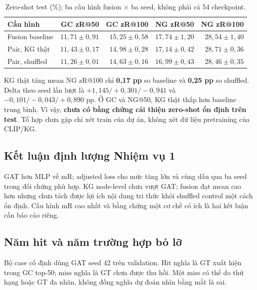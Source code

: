 \begin{table}[!t]\centering\small
\caption{Zero-shot test (\%); ba cấu hình fusion $\times$ ba seed, không phải cả 54 checkpoint.}\label{tab:zero}
\begin{tabular}{@{}lrrrr@{}}\toprule
Cấu hình & GC zR@50 & GC zR@100 & NG zR@50 & NG zR@100\\\midrule
Fusion baseline & $11,71\pm0,91$ & $15,25\pm0,58$ & $17,74\pm1,20$ & $28,54\pm1,40$\\
Pair, KG thật & $11,43\pm0,17$ & $14,98\pm0,28$ & $17,14\pm0,42$ & $28,71\pm0,36$\\
Pair, shuffled & $11,26\pm0,01$ & $14,63\pm0,16$ & $16,99\pm0,43$ & $28,46\pm0,35$\\
\bottomrule\end{tabular}\end{table}

KG thật tăng mean NG zR@100 chỉ \textbf{0,17 pp} so baseline và
\textbf{0,25 pp} so shuffled. Delta theo seed lần lượt là
$+1,145/+0,301/-0,941$ và $-0,101/-0,043/+0,890$ pp.
Ở GC và NG@50, KG thật thấp hơn baseline trung bình.
Vì vậy, \textbf{chưa có bằng chứng cải thiện zero-shot ổn định trên test}.
Tổ hợp chưa gặp chỉ xét train của dự án, không xét dữ liệu pretraining của CLIP/KG.

\subsection{Kết luận định lượng Nhiệm vụ 1}
GAT hơn MLP về mR; adjusted loss cho mức tăng lớn và cùng dấu qua ba seed
trong đối chứng phù hợp. KG node-level chưa vượt GAT; fusion đạt mean cao hơn
nhưng chưa tách được lợi ích nội dung tri thức khỏi shuffled control một cách
ổn định. Cấu hình mR cao nhất và bằng chứng một cơ chế có ích là hai
kết luận cần báo cáo riêng.


\subsection{Năm hit và năm trường hợp bỏ lỡ}
Bộ case cố định dùng GAT seed 42 trên validation. Hit nghĩa là GT xuất hiện
trong GC top-50; miss nghĩa là GT chưa được thu hồi. Một miss có thể do thứ
hạng hoặc GT đa nhãn, không đồng nghĩa dự đoán nhìn bằng mắt là sai.

